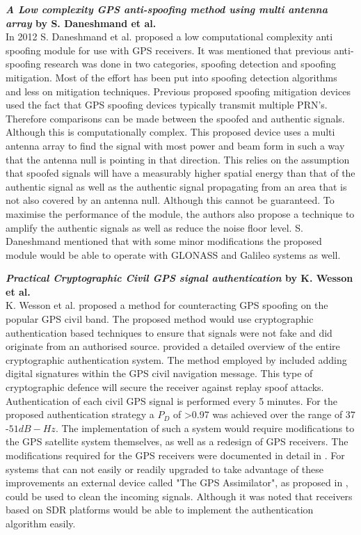 \medskip

\textbf{\emph{A Low complexity GPS anti-spoofing method using multi antenna array} by S. Daneshmand et al.} \\
In 2012 S. Daneshmand et al.\cite{RN8} proposed a low computational complexity anti spoofing module for use with GPS receivers.
It was mentioned that previous anti-spoofing research was done in two categories, spoofing detection and spoofing mitigation.
Most of the effort has been put into spoofing detection algorithms and less on mitigation techniques. 
Previous proposed spoofing mitigation devices used the fact that GPS spoofing devices typically transmit multiple PRN's. 
Therefore comparisons can be made between the spoofed and authentic signals. Although this is computationally complex. This proposed
device uses a multi antenna array to find the signal with most power and beam form in such a way that the antenna null is pointing in
that direction. This relies on the assumption that spoofed signals will have a measurably higher spatial energy than that of the authentic signal
as well as the authentic signal propagating from an area that is not also covered by an antenna null. Although this cannot be guaranteed.
To maximise the performance of the module, the authors also propose a technique to amplify the authentic signals as well as reduce the noise floor level.
S. Daneshmand mentioned that with some minor modifications the proposed module would be able to operate with GLONASS and Galileo systems as well. 

\medskip

\textbf{\emph{Practical Cryptographic Civil GPS signal authentication} by K. Wesson et al.} \\
K. Wesson et al. \cite{RN13} proposed a method for counteracting GPS spoofing on the popular GPS civil band. The proposed method would use cryptographic
authentication based techniques to ensure that signals were not fake and did originate from an authorised source.
\citeauthor{RN13} provided a detailed overview of the entire cryptographic authentication system.
The method employed by \citeauthor{RN13} included adding digital signatures within the GPS civil navigation message. This type of cryptographic defence
will secure the receiver against replay spoof attacks. Authentication of each civil GPS signal is performed every 5 minutes.
For the proposed authentication strategy a $P_D$ of >0.97 was achieved over the range of $37$-$51 dB-Hz$.
The implementation of such a system would require modifications to the GPS satellite system themselves, as well as a redesign of GPS receivers.
The modifications required for the GPS receivers were documented in detail in \cite{RN13}. For systems that can not easily or readily upgraded to
take advantage of these improvements an external device called "The GPS Assimilator", as proposed in \cite{RN19}, could be used to clean the incoming
signals.
Although it was noted that receivers based on SDR platforms would be able to implement the authentication algorithm easily.

